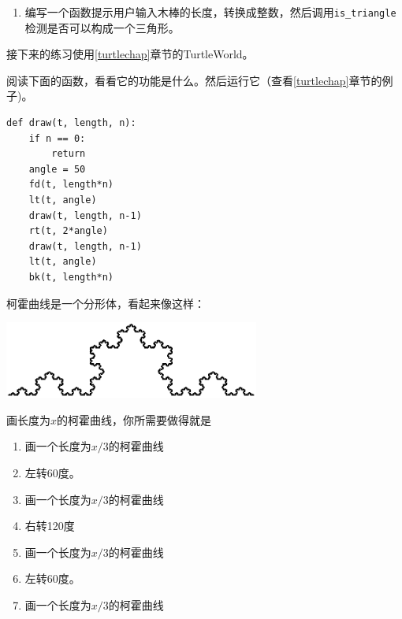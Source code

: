{{\begin{费马最后定理}
\begin{ex}
\begin{enumerate}
\item 编写一个函数提示用户输入木棒的长度，转换成整数，然后调用\verb"is_triangle"检测是否可以构成一个三角形。

\end{enumerate}

\end{ex}

接下来的练习使用\ref{turtlechap}章节的TurtleWorld。

\begin{ex}

阅读下面的函数，看看它的功能是什么。然后运行它（查看\ref{turtlechap}章节的例子)。

\beforeverb
\begin{verbatim}
def draw(t, length, n):
    if n == 0:
        return
    angle = 50
    fd(t, length*n)
    lt(t, angle)
    draw(t, length, n-1)
    rt(t, 2*angle)
    draw(t, length, n-1)
    lt(t, angle)
    bk(t, length*n)
\end{verbatim}
\afterverb

\end{ex}

\begin{ex}

柯霍曲线是一个分形体，看起来像这样：

\beforefig
\centerline{\includegraphics[height=1in]{figs/koch.eps}}
\afterfig

画长度为$x$的柯霍曲线，你所需要做得就是
\begin{enumerate}

\item 画一个长度为$x/3$的柯霍曲线

\item 左转60度。

\item 画一个长度为$x/3$的柯霍曲线

\item 右转120度

\item 画一个长度为$x/3$的柯霍曲线

\item 左转60度。

\item 画一个长度为$x/3$的柯霍曲线


\end{enumerate}
\end{ex}
\end{费马最后定理}}}
